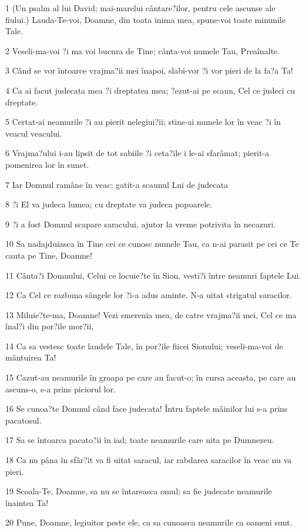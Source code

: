 \par 1 (Un psalm al lui David; mai-marelui cântare?ilor, pentru cele ascunse ale fiului.) Lauda-Te-voi, Doamne, din toata inima mea, spune-voi toate minunile Tale.
\par 2 Veseli-ma-voi ?i ma voi bucura de Tine; cânta-voi numele Tau, Preaînalte.
\par 3 Când se vor întoarce vrajma?ii mei înapoi, slabi-vor ?i vor pieri de la fa?a Ta!
\par 4 Ca ai facut judecata mea ?i dreptatea mea; ?ezut-ai pe scaun, Cel ce judeci cu dreptate.
\par 5 Certat-ai neamurile ?i au pierit nelegiui?ii; stins-ai numele lor în veac ?i în veacul veacului.
\par 6 Vrajma?ului i-au lipsit de tot sabiile ?i ceta?ile i le-ai sfarâmat; pierit-a pomenirea lor în sunet.
\par 7 Iar Domnul ramâne în veac; gatit-a scaunul Lui de judecata
\par 8 ?i El va judeca lumea; cu dreptate va judeca popoarele.
\par 9 ?i a fost Domnul scapare saracului, ajutor la vreme potrivita în necazuri.
\par 10 Sa nadajduiasca în Tine cei ce cunosc numele Tau, ca n-ai parasit pe cei ce Te cauta pe Tine, Doamne!
\par 11 Cânta?i Domnului, Celui ce locuie?te în Sion, vesti?i între neamuri faptele Lui.
\par 12 Ca Cel ce razbuna sângele lor ?i-a adus aminte. N-a uitat strigatul saracilor.
\par 13 Miluie?te-ma, Doamne! Vezi smerenia mea, de catre vrajma?ii mei, Cel ce ma înal?i din por?ile mor?ii,
\par 14 Ca sa vestesc toate laudele Tale, în por?ile fiicei Sionului; veseli-ma-voi de mântuirea Ta!
\par 15 Cazut-au neamurile în groapa pe care au facut-o; în cursa aceasta, pe care au ascuns-o, s-a prins piciorul lor.
\par 16 Se cunoa?te Domnul când face judecata! Întru faptele mâinilor lui s-a prins pacatosul.
\par 17 Sa se întoarca pacato?ii în iad; toate neamurile care uita pe Dumnezeu.
\par 18 Ca nu pâna în sfâr?it va fi uitat saracul, iar rabdarea saracilor în veac nu va pieri.
\par 19 Scoala-Te, Doamne, sa nu se întareasca omul; sa fie judecate neamurile înaintea Ta!
\par 20 Pune, Doamne, legiuitor peste ele, ca sa cunoasca neamurile ca oameni sunt.

